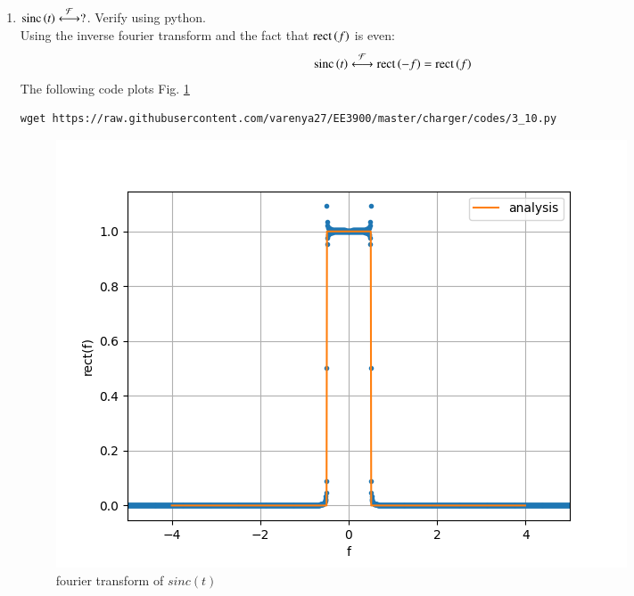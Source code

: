 \documentclass[journal,12pt,twocolumn]{IEEEtran}
\renewcommand\thesection{\arabic{section}}
\begin{document}
\begin{enumerate}[label=\thesection.\arabic*
,ref=\thesection.\theenumi]
 \item 
$	 \text{sinc}\left(t\right)\overset{\mathcal{F}}{ \longleftrightarrow} ?$.  Verify using python.
\\\solution Using the inverse fourier transform and the fact that $\text{rect}\left(f\right)$ is even:
\begin{align}
    \text{sinc}\left(t\right)\overset{\mathcal{F}}{ \longleftrightarrow}\text{rect}\left(-f\right)=\text{rect}\left(f\right)
\end{align}
  The following code plots Fig. \ref{fig:sinc-ft}
	\begin{lstlisting}
wget https://raw.githubusercontent.com/varenya27/EE3900/master/charger/codes/3_10.py
\end{lstlisting}
	\begin{figure}[h!]
	    \centering
	    \includegraphics[width=\columnwidth]{figures/sinc-ft.png}
	    \caption{fourier transform of $sinc(t)$ }
	    \label{fig:sinc-ft}
	\end{figure}
\end{enumerate}
\end{document}
